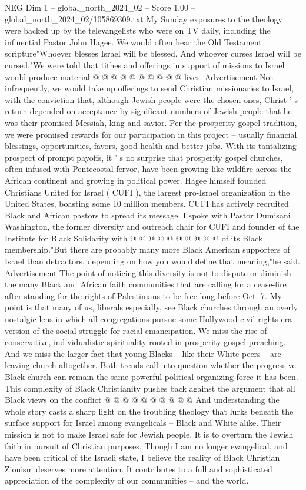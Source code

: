 \begin{textsample}{NEG Dim 1 – global\_north\_2024\_02 – Score 1.00 – global\_north\_2024\_02/105869309.txt}
My Sunday exposures to the theology were backed up by the televangelists who were on TV daily, including the influential Pastor John Hagee.
We would often hear the Old Testament scripture"Whoever blesses Israel will be blessed, And whoever curses Israel will be cursed."We were told that tithes and offerings in support of missions to Israel would produce material @ @ @ @ @ @ @ @ @ @ lives.
Advertisement Not infrequently, we would take up offerings to send Christian missionaries to Israel, with the conviction that, although Jewish people were the chosen ones, Christ ' s return depended on acceptance by significant numbers of Jewish people that he was their promised Messiah, king and savior.
Per the prosperity gospel tradition, we were promised rewards for our participation in this project -- usually financial blessings, opportunities, favors, good health and better jobs.
With its tantalizing prospect of prompt payoffs, it ' s no surprise that prosperity gospel churches, often infused with Pentecostal fervor, have been growing like wildfire across the African continent and growing in political power.
Hagee himself founded Christians United for Israel ( CUFI ), the largest pro-Israel organization in the United States, boasting some 10 million members.
CUFI has actively recruited Black and African pastors to spread its message.
I spoke with Pastor Dumisani Washington, the former diversity and outreach chair for CUFI and founder of the Institute for Black Solidarity with @ @ @ @ @ @ @ @ @ @ of its Black membership."But there are probably many more Black American supporters of Israel than detractors, depending on how you would define that meaning,"he said.
Advertisement The point of noticing this diversity is not to dispute or diminish the many Black and African faith communities that are calling for a cease-fire after standing for the rights of Palestinians to be free long before Oct. 7.
My point is that many of us, liberals especially, see Black churches through an overly nostalgic lens in which all congregations pursue some Hollywood civil rights era version of the social struggle for racial emancipation.
We miss the rise of conservative, individualistic spirituality rooted in prosperity gospel preaching.
And we miss the larger fact that young Blacks -- like their White peers -- are leaving church altogether.
Both trends call into question whether the progressive Black church can remain the same powerful political organizing force it has been.
This complexity of Black Christianity pushes back against the argument that all Black views on the conflict @ @ @ @ @ @ @ @ @ @ And understanding the whole story casts a sharp light on the troubling theology that lurks beneath the surface support for Israel among evangelicals -- Black and White alike.
Their mission is not to make Israel safe for Jewish people.
It is to overturn the Jewish faith in pursuit of Christian purposes.
Though I am no longer evangelical, and have been critical of the Israeli state, I believe the reality of Black Christian Zionism deserves more attention.
It contributes to a full and sophisticated appreciation of the complexity of our communities -- and the world.

\end{textsample}
